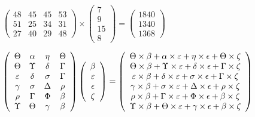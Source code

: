 \documentclass[12pt]{article}
\begin{document}
 
 
\noindent{}
 
 

 
$\left( \begin{array}{ccccccccccccccc}
          48  & 
          45  & 
          45  & 
          53  \\ 
          51  & 
          25  & 
          34  & 
          31  \\ 
          27  & 
          40  & 
          29  & 
          48
\end{array}\right) \times
\left( \begin{array}{c}
           7  \\ 
           9  \\ 
          15  \\ 
           8
\end{array}\right)  =
\left( \begin{array}{c}
        1840  \\ 
        1340  \\ 
        1368
\end{array}\right)  $
 
$  %
 \left( \begin{array}
 {
 c
 c
 c
 c
 }
 \Theta & 
 \alpha & 
 \eta & 
 \Theta \\ 
 \Theta & 
 \Upsilon & 
 \delta & 
 \Gamma \\ 
 \varepsilon & 
 \delta & 
 \sigma & 
 \Gamma \\ 
 \gamma & 
 \sigma & 
 \Delta & 
 \rho \\ 
 \rho & 
 \Gamma & 
 \Phi & 
 \beta \\ 
 \Upsilon & 
 \Theta & 
 \gamma & 
 \beta
 \end{array} \right)
 \left( \begin{array}
 {
 c
 }
 \beta \\ 
 \varepsilon \\ 
 \epsilon \\ 
                    \zeta
 \end{array} \right)
=
 \left( \begin{array}
 {
 c
 }
  \Theta \times  \beta +  \alpha \times  \varepsilon +  \eta \times  \epsilon +  \Theta \times                     \zeta \\ 
  \Theta \times  \beta +  \Upsilon \times  \varepsilon +  \delta \times  \epsilon +  \Gamma \times                     \zeta \\ 
  \varepsilon \times  \beta +  \delta \times  \varepsilon +  \sigma \times  \epsilon +  \Gamma \times                     \zeta \\ 
  \gamma \times  \beta +  \sigma \times  \varepsilon +  \Delta \times  \epsilon +  \rho \times                     \zeta \\ 
  \rho \times  \beta +  \Gamma \times  \varepsilon +  \Phi \times  \epsilon +  \beta \times                     \zeta \\ 
  \Upsilon \times  \beta +  \Theta \times  \varepsilon +  \gamma \times  \epsilon +  \beta \times                     \zeta
 \end{array} \right)
$
 
\end{document}
